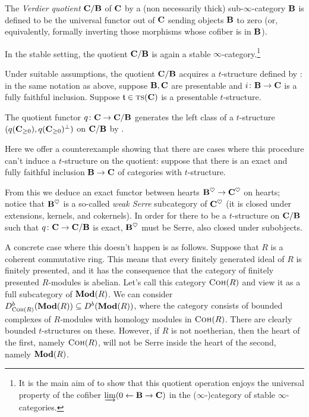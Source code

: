 \begin{definition}
The \emph{Verdier quotient} $\mathbf{C}/\mathbf{B}$ of $\mathbf{C}$ by a (non necessarily thick) sub\hyp{}$\infty$\hyp{}category $\mathbf{B}$ is defined to be the universal functor out of $\mathbf{C}$ sending objects $\mathbf{B}$ to zero (or, equivalently, formally inverting those morphisms whose cofiber is in $\mathbf{B}$).

In the stable setting, the quotient $\mathbf{C}/\mathbf{B}$ is again a stable $\infty$\hyp{}category.\footnote{It is the main aim of \cite{} to show that this quotient operation enjoys the universal property of the cofiber $\varinjlim(0\leftarrow \mathbf{B}\to \mathbf{C})$ in the ($\infty$\hyp{})category of stable $\infty$\hyp{}categories.}

Under suitable assumptions, the quotient $\mathbf{C}/\mathbf{B}$ acquires a $t$\hyp{}structure defined by \cite[\aprop \textbf{1.4.4.11}]{LurieHA}: in the same notation as above, suppose $\mathbf{B},\mathbf{C}$ are presentable and $i\colon \mathbf{B}\to \mathbf{C}$ is a fully faithful inclusion. Suppose $\mathfrak{t}\in\text{\scshape ts}(\mathbf{C})$ is a presentable $t$\hyp{}structure.

The quotient functor $q\colon \mathbf{C} \to \mathbf{C}/\mathbf{B}$ generates the left class of a $t$\hyp{}structure $(q(\mathbf{C}_{\ge 0}), q(\mathbf{C}_{\ge 0})^\perp)$ on $\mathbf{C}/\mathbf{B}$ by \cite[\aprop \textbf{1.4.4.11}]{LurieHA}.
\end{definition}
\begin{remark}
Here we offer a counterexample \cite{antieau201Xmo} showing that there are cases where this procedure can't induce a $t$\hyp{}structure on the quotient: suppose that there is an exact and fully faithful inclusion $\mathbf{B}\rightarrow \mathbf{C}$ of categories with $t$\hyp{}structure.

From this we deduce an exact functor between hearts $\mathbf{B}^\heartsuit\rightarrow \mathbf{C}^\heartsuit$ on hearts; notice that $\mathbf{B}^\heartsuit$ is a so\hyp{}called \emph{weak Serre} subcategory of $\mathbf{C}^\heartsuit$ (it is closed under extensions, kernels, and cokernels). In order for there to be a $t$\hyp{}structure on $\mathbf{C}/\mathbf{B}$ such that $q\colon \mathbf{C}\rightarrow \mathbf{C}/\mathbf{B}$ is exact, $\mathbf{B}^\heartsuit$ must be Serre, \ie also closed under subobjects.

A concrete case where this doesn't happen is as follows. Suppose that $R$ is a coherent commutative ring. This means that every finitely generated ideal of $R$ is finitely presented, and it has the consequence that the category of finitely presented $R$\hyp{}modules is abelian. Let's call this category $\text{\scshape Coh}(R)$ and view it as a full subcategory of $\mathbf{Mod}(R)$. We can consider $D^b_{\text{\scshape Coh}(R)}(\mathbf{Mod}(R))\subseteq D^b(\mathbf{Mod}(R))$, where the category consists of bounded complexes of $R$\hyp{}modules with homology modules in $\text{\scshape Coh}(R)$. There are clearly bounded $t$\hyp{}structures on these. However, if $R$ is not noetherian, then the heart of the first, namely $\text{\scshape Coh}(R)$, will not be Serre inside the heart of the second, namely $\mathbf{Mod}(R)$.
\end{remark}
